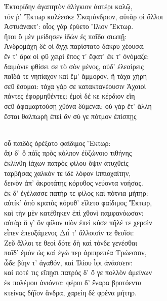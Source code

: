 \begin{Versi}[390]
Ἑκτορίδην ἀγαπητὸν ἀλίγκιον ἀστέρι καλῷ,\\ %
τόν ῥ' Ἕκτωρ καλέεσκε Σκαμάνδριον, αὐτὰρ οἱ ἄλλοι\\
Ἀστυάνακτ': οἶος γὰρ ἐρύετο Ἴλιον Ἕκτωρ.\\
ἤτοι ὃ μὲν μείδησεν ἰδὼν ἐς παῖδα σιωπῇ:\\
Ἀνδρομάχη δέ οἱ ἄγχι παρίστατο δάκρυ χέουσα,\\
ἔν τ' ἄρα οἱ φῦ χειρὶ ἔπος τ' ἔφατ' ἔκ τ' ὀνόμαζε:\\
δαιμόνιε φθίσει σε τὸ σὸν μένος, οὐδ' ἐλεαίρεις\\
παῖδά τε νηπίαχον καὶ ἔμ' ἄμμορον, ἣ τάχα χήρη\\
σεῦ ἔσομαι: τάχα γάρ σε κατακτανέουσιν Ἀχαιοὶ\\
πάντες ἐφορμηθέντες: ἐμοὶ δέ κε κέρδιον εἴη\\
σεῦ ἀφαμαρτούσῃ χθόνα δύμεναι: οὐ γὰρ ἔτ' ἄλλη\\
ἔσται θαλπωρὴ ἐπεὶ ἂν σύ γε πότμον ἐπίσπῃς\\ \ladd{\ldots}\\
\end{Versi}
\begin{Versi}[466]
\ladd{\ldots} οὗ παιδὸς ὀρέξατο φαίδιμος Ἕκτωρ:\\
ἂψ δ' ὃ πάϊς πρὸς κόλπον ἐϋζώνοιο τιθήνης\\
ἐκλίνθη ἰάχων πατρὸς φίλου ὄψιν ἀτυχθεὶς\\
ταρβήσας χαλκόν τε ἰδὲ λόφον ἱππιοχαίτην,\\
δεινὸν ἀπ' ἀκροτάτης κόρυθος νεύοντα νοήσας.\\
ἐκ δ' ἐγέλασσε πατήρ τε φίλος καὶ πότνια μήτηρ:\\
αὐτίκ' ἀπὸ κρατὸς κόρυθ' εἵλετο φαίδιμος Ἕκτωρ,\\
καὶ τὴν μὲν κατέθηκεν ἐπὶ χθονὶ παμφανόωσαν:\\
αὐτὰρ ὅ γ' ὃν φίλον υἱὸν ἐπεὶ κύσε πῆλέ τε χερσὶν\\
εἶπεν ἐπευξάμενος Διΐ τ' ἄλλοισίν τε θεοῖσι:\\
Ζεῦ ἄλλοι τε θεοὶ δότε δὴ καὶ τόνδε γενέσθαι\\
παῖδ' ἐμὸν ὡς καὶ ἐγώ περ ἀριπρεπέα Τρώεσσιν,\\
ὧδε βίην τ' ἀγαθόν, καὶ Ἰλίου ἶφι ἀνάσσειν:\\
καί ποτέ τις εἴπῃσι πατρός δ' ὅ γε πολλὸν ἀμείνων\\
ἐκ πολέμου ἀνιόντα: φέροι δ' ἔναρα βροτόεντα\\
κτείνας δήϊον ἄνδρα, χαρείη δὲ φρένα μήτηρ.\\
\end{Versi}